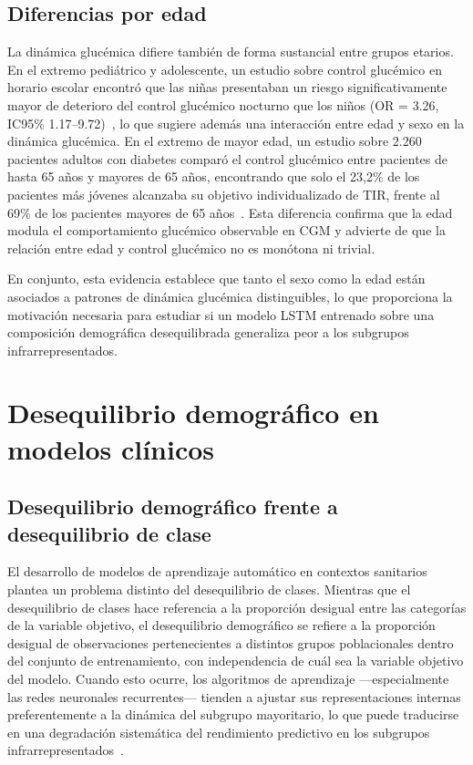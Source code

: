 \subsection{Diferencias por edad}
\label{subsec:diferencias_edad}

La dinámica glucémica difiere también de forma sustancial entre grupos etarios. En el extremo pediátrico y adolescente, un estudio sobre control glucémico en horario escolar encontró que las niñas presentaban un riesgo significativamente mayor de deterioro del control glucémico nocturno que los niños (OR = 3.26, IC95\% 1.17--9.72)~\cite{deng2022schooldays}, lo que sugiere además una interacción entre edad y sexo en la dinámica glucémica. En el extremo de mayor edad, un estudio sobre 2.260 pacientes adultos con diabetes comparó el control glucémico entre pacientes de hasta 65 años y mayores de 65 años, encontrando que solo el 23,2\% de los pacientes más jóvenes alcanzaba su objetivo individualizado de TIR, frente al 69\% de los pacientes mayores de 65 años~\cite{nwokolo2024agecgm}. Esta diferencia confirma que la edad modula el comportamiento glucémico observable en CGM y advierte de que la relación entre edad y control glucémico no es monótona ni trivial.

En conjunto, esta evidencia establece que tanto el sexo como la edad están asociados a patrones de dinámica glucémica distinguibles, lo que proporciona la motivación necesaria para estudiar si un modelo LSTM entrenado sobre una composición demográfica desequilibrada generaliza peor a los subgrupos infrarrepresentados.

\section{Desequilibrio demográfico en modelos clínicos}
\label{sec:desequilibrio_demografico_literatura}

\subsection{Desequilibrio demográfico frente a desequilibrio de clase}
\label{subsec:desequilibrio_demografico_vs_clase}

El desarrollo de modelos de aprendizaje automático en contextos sanitarios plantea un problema distinto del desequilibrio de clases. Mientras que el desequilibrio de clases hace referencia a la proporción desigual entre las categorías de la variable objetivo, el desequilibrio demográfico se refiere a la proporción desigual de observaciones pertenecientes a distintos grupos poblacionales dentro del conjunto de entrenamiento, con independencia de cuál sea la variable objetivo del modelo. Cuando esto ocurre, los algoritmos de aprendizaje —especialmente las redes neuronales recurrentes— tienden a ajustar sus representaciones internas preferentemente a la dinámica del subgrupo mayoritario, lo que puede traducirse en una degradación sistemática del rendimiento predictivo en los subgrupos infrarrepresentados~\cite{straw2022sexbias,ricci2024sociodemographic}.

